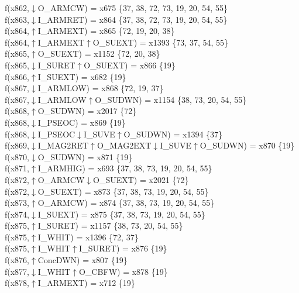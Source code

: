 f(x862,$\downarrow$O\_ARMCW) = x675 \{37, 38, 72, 73, 19, 20, 54, 55\} \\  
f(x863,$\downarrow$I\_ARMRET) = x864 \{37, 38, 72, 73, 19, 20, 54, 55\} \\  
f(x864,$\uparrow$I\_ARMEXT) = x865 \{72, 19, 20, 38\} \\  
f(x864,$\uparrow$I\_ARMEXT$\uparrow$O\_SUEXT) = x1393 \{73, 37, 54, 55\} \\  
f(x865,$\uparrow$O\_SUEXT) = x1152 \{72, 20, 38\} \\  
f(x865,$\downarrow$I\_SURET$\uparrow$O\_SUEXT) = x866 \{19\} \\  
f(x866,$\uparrow$I\_SUEXT) = x682 \{19\} \\  
f(x867,$\downarrow$I\_ARMLOW) = x868 \{72, 19, 37\} \\  
f(x867,$\downarrow$I\_ARMLOW$\uparrow$O\_SUDWN) = x1154 \{38, 73, 20, 54, 55\} \\  
f(x868,$\uparrow$O\_SUDWN) = x2017 \{72\} \\  
f(x868,$\downarrow$I\_PSEOC) = x869 \{19\} \\  
f(x868,$\downarrow$I\_PSEOC$\downarrow$I\_SUVE$\uparrow$O\_SUDWN) = x1394 \{37\} \\  
f(x869,$\downarrow$I\_MAG2RET$\uparrow$O\_MAG2EXT$\downarrow$I\_SUVE$\uparrow$O\_SUDWN) = x870 \{19\} \\  
f(x870,$\downarrow$O\_SUDWN) = x871 \{19\} \\  
f(x871,$\uparrow$I\_ARMHIG) = x693 \{37, 38, 73, 19, 20, 54, 55\} \\  
f(x872,$\uparrow$O\_ARMCW$\downarrow$O\_SUEXT) = x2021 \{72\} \\  
f(x872,$\downarrow$O\_SUEXT) = x873 \{37, 38, 73, 19, 20, 54, 55\} \\  
f(x873,$\uparrow$O\_ARMCW) = x874 \{37, 38, 73, 19, 20, 54, 55\} \\  
f(x874,$\downarrow$I\_SUEXT) = x875 \{37, 38, 73, 19, 20, 54, 55\} \\  
f(x875,$\uparrow$I\_SURET) = x1157 \{38, 73, 20, 54, 55\} \\  
f(x875,$\uparrow$I\_WHIT) = x1396 \{72, 37\} \\  
f(x875,$\uparrow$I\_WHIT$\uparrow$I\_SURET) = x876 \{19\} \\  
f(x876,$\uparrow$ConcDWN) = x807 \{19\} \\  
f(x877,$\downarrow$I\_WHIT$\uparrow$O\_CBFW) = x878 \{19\} \\  
f(x878,$\uparrow$I\_ARMEXT) = x712 \{19\} \\  
